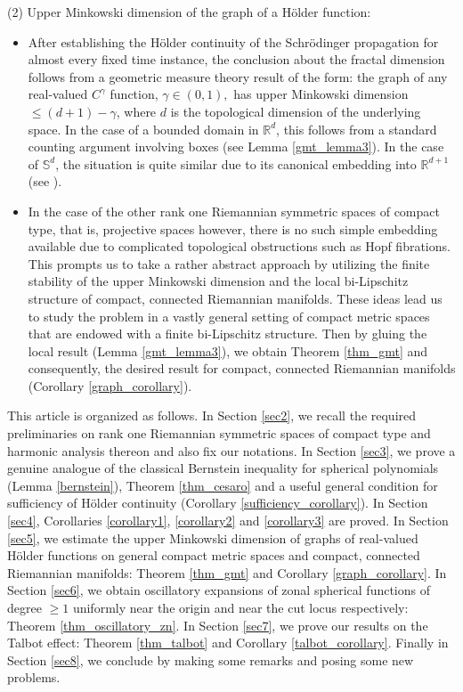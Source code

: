 \documentclass[12pt]{amsart}
\theoremstyle{definition}
\newcommand{\R}{\mathbb R}%
\newcommand{\Sb}{\mathbb S}%
\numberwithin{equation}{section}
\begin{document}
\medskip

(2) Upper Minkowski dimension of the graph of a H\"older function:

\begin{itemize}
\item After establishing the H\"older continuity of the Schr\"odinger propagation for almost every fixed time instance, the conclusion about the fractal dimension follows from a geometric measure theory result of the form: the graph of any real-valued $C^\gamma$ function, $\gamma \in (0,1),$ has upper Minkowski dimension  $\le (d+1)-\gamma$, where $d$ is the topological dimension of the underlying space. In the case of a bounded domain in $\R^d$, this follows from a standard counting argument involving boxes (see Lemma \ref{gmt_lemma3}). In the case of $\Sb^d$, the situation is quite similar due to its canonical embedding into $\R^{d+1}$ (see \cite{Huynh}). 

\medskip

\item In the case of the other rank one Riemannian symmetric spaces of compact type, that is, projective spaces however, there is no such simple embedding available due to complicated topological obstructions such as Hopf fibrations. This prompts us to take a rather abstract approach by utilizing the finite stability of the upper Minkowski dimension and the local bi-Lipschitz structure of compact, connected Riemannian manifolds. These ideas lead us to study the problem in a vastly general setting of compact metric spaces that are endowed with a finite bi-Lipschitz structure. Then by gluing the local result (Lemma \ref{gmt_lemma3}), we obtain Theorem \ref{thm_gmt} and consequently, the desired result for compact, connected Riemannian manifolds (Corollary \ref{graph_corollary}).
\end{itemize}

This article is organized as follows. In Section \ref{sec2}, we recall the required preliminaries on rank one Riemannian symmetric spaces of compact type and harmonic analysis thereon and also fix our notations. In Section \ref{sec3}, we prove a genuine analogue of the classical Bernstein inequality for spherical polynomials (Lemma \ref{bernstein}), Theorem \ref{thm_cesaro} and a useful general condition for sufficiency of H\"older continuity (Corollary \ref{sufficiency_corollary}). In Section \ref{sec4}, Corollaries \ref{corollary1}, \ref{corollary2} and \ref{corollary3} are proved. In Section \ref{sec5}, we estimate the upper Minkowski dimension of graphs of real-valued H\"older functions on general compact metric spaces and compact, connected Riemannian manifolds: Theorem \ref{thm_gmt} and Corollary \ref{graph_corollary}. In Section \ref{sec6}, we obtain oscillatory expansions of zonal spherical functions of degree $\ge 1$ uniformly near the origin and near the cut locus respectively: Theorem \ref{thm_oscillatory_zn}. In Section \ref{sec7}, we prove our results on the Talbot effect: Theorem \ref{thm_talbot} and Corollary \ref{talbot_corollary}. Finally in Section \ref{sec8}, we conclude by making some remarks and posing some new problems. 
\end{document}
